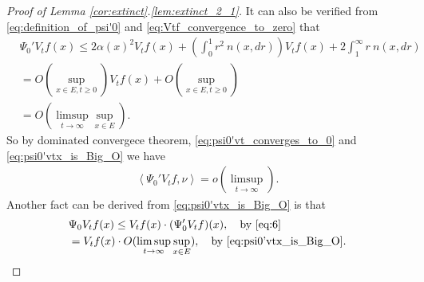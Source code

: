 \documentclass[12pt,a4paper]{amsart}
\numberwithin{equation}{section}
\theoremstyle{plain}
\theoremstyle{definition}
\begin{document}
\begin{proof}[Proof of Lemma \ref{cor:extinct}.\eqref{lem:extinct_2_1}]
It can also be verified from \eqref{eq:definition_of_psi'0} and \eqref{eq:Vtf_convergence_to_zero} that
\begin{align}
&\Psi_0'V_tf(x) \leq 2\alpha(x)^2 V_tf(x)+ \left(\int_0^1 r^2~n(x, dr)\right) V_tf(x) + 2 \int_1^\infty r~n(x,dr)
\\&= O(\sup_{x\in E,t\geq 0})V_tf(x)+ O(\sup_{x\in E,t\geq 0})
\\&=  O(\limsup_{t\to \infty} \sup_{x\in E}). \label{eq:psi0'vtx_is_Big_O}
\end{align}
So by dominated convergece theorem, \eqref{eq:psi0'vt_converges_to_0} and \eqref{eq:psi0'vtx_is_Big_O} we have
\begin{align}
\label{eq:Psi0'Vtfnu_is_smallo}
\left\langle \Psi_0' V_tf, \nu \right\rangle = o(\limsup_{t\to \infty}).
\end{align}
Another fact can be derived from \eqref{eq:psi0'vtx_is_Big_O} is that
\begin{align}
&\Psi_0 V_tf(x) 
\leq V_tf(x) \cdot (\Psi'_0 V_tf)(x) ,\quad\text{by~\eqref{eq:6}}
  \\&= V_tf(x)\cdot O(\limsup_{t\to \infty} \sup_{x\in E}),\quad\text{by~\eqref{eq:psi0'vtx_is_Big_O}}.\label{eq:Psi0_Vtf_leq_Vtf}
\end{align}


\end{proof}
\end{document}
